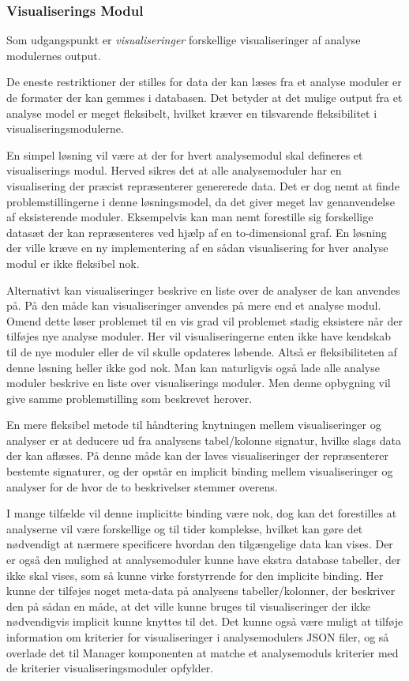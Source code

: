 \subsubsection{Visualiserings Modul}\label{sec:visningsmodul}
Som udgangspunkt er \textit{visualiseringer} forskellige visualiseringer af analyse modulernes output.

De eneste restriktioner der stilles for data der kan læses fra et analyse moduler er de formater der kan gemmes i databasen.
Det betyder at det mulige output fra et analyse model er meget fleksibelt, hvilket kræver en tilsvarende fleksibilitet i visualiseringsmodulerne.

En simpel løsning vil være at der for hvert analysemodul skal defineres et visualiserings modul.
Herved sikres det at alle analysemoduler har en visualisering der præcist repræsenterer genererede data.
Det er dog nemt at finde problemstillingerne i denne løsningsmodel, da det giver meget lav genanvendelse af eksisterende moduler.
Eksempelvis kan man nemt forestille sig forskellige datasæt der kan repræsenteres ved hjælp af en to-dimensional graf.
En løsning der ville kræve en ny implementering af en sådan visualisering for hver analyse modul er ikke fleksibel nok.

Alternativt kan visualiseringer beskrive en liste over de analyser de kan anvendes på.
På den måde kan visualiseringer anvendes på mere end et analyse modul.
Omend dette løser problemet til en vis grad vil problemet stadig eksistere når der tilføjes nye analyse moduler.
Her vil visualiseringerne enten ikke have kendskab til de nye moduler eller de vil skulle opdateres løbende.
Altså er fleksibiliteten af denne løsning heller ikke god nok.
Man kan naturligvis også lade alle analyse moduler beskrive en liste over visualiserings moduler.
Men denne opbygning vil give samme problemstilling som beskrevet herover.

En mere fleksibel metode til håndtering knytningen mellem visualiseringer og analyser er at deducere ud fra analysens tabel/kolonne signatur, hvilke slags data der kan aflæses.
På denne måde kan der laves visualiseringer der repræsenterer bestemte signaturer, og der opstår en implicit binding mellem visualiseringer og analyser for de hvor de to beskrivelser stemmer overens.

I mange tilfælde vil denne implicitte binding være nok, dog kan det forestilles at analyserne vil være forskellige og til tider komplekse, hvilket kan gøre det nødvendigt at nærmere specificere hvordan den tilgængelige data kan vises.
Der er også den mulighed at analysemoduler kunne have ekstra database tabeller, der ikke skal vises, som så kunne virke forstyrrende for den implicite binding.
Her kunne der tilføjes noget meta-data på analysens tabeller/kolonner, der beskriver den på sådan en måde, at det ville kunne bruges til visualiseringer der ikke nødvendigvis implicit kunne knyttes til det.
Det kunne også være muligt at tilføje information om kriterier for visualiseringer i analysemodulers JSON filer, og så overlade det til Manager komponenten at matche et analysemoduls kriterier med de kriterier visualiseringsmoduler opfylder.

